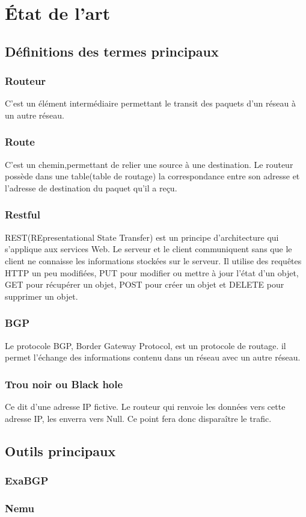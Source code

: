 \chapter{État de l'art}

\section{Définitions des termes principaux}

\subsection{Routeur}
C'est un élément intermédiaire permettant le transit des paquets d'un réseau à un autre réseau.

\subsection{Route}
C'est un chemin,permettant de relier une source à une destination. Le routeur possède dans une table(table de routage) la correspondance entre son adresse et l'adresse de destination du paquet qu'il a reçu.

\subsection{Restful}
REST(REpresentational State Transfer) est un principe d'architecture qui s'applique aux services Web. Le serveur et le client communiquent sans que le client ne connaisse les informations stockées sur le serveur. Il utilise des requêtes HTTP un peu modifiées, PUT pour modifier ou mettre à jour l'état d'un objet, GET pour récupérer un objet, POST pour créer un objet et DELETE pour supprimer un objet.

\subsection{BGP}
Le protocole BGP, Border Gateway Protocol, est un protocole de routage. il permet l'échange des informations contenu dans un réseau avec un autre réseau.

\subsection{Trou noir ou Black hole}
Ce dit d'une adresse IP fictive. Le routeur qui renvoie les données vers cette adresse IP, les enverra vers Null. Ce point fera donc disparaître le trafic.

\section{Outils principaux}

\subsection{ExaBGP}

\subsection{Nemu}
